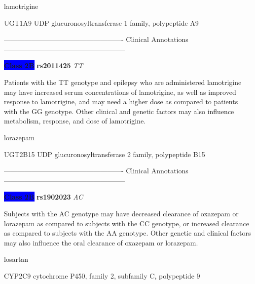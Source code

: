 \documentclass{resume} %
\begin{document}
\begin{rSection}{ lamotrigine }
\begin{rSubsection}{ UGT1A9 }{ UDP glucuronosyltransferase 1 family, polypeptide A9 }{}{}
\item[] ---------------------------------------------------- Clinical Annotations -----------------------------------------------------\newline
\item \textbf{\colorbox{blue} {Class 2B}} \textbf{ rs2011425 } \textit{ TT }
\item[] Patients with the TT genotype and epilepsy who are administered lamotrigine may have increased serum concentrations of lamotrigine, as well as improved response to lamotrigine, and may need a higher dose as compared to patients with the GG genotype. Other clinical and genetic factors may also influence metabolism, response, and dose of lamotrigine.  
\end{rSubsection}

\end{rSection}\begin{rSection}{ lorazepam }
\item[]

\begin{rSubsection}{ UGT2B15 }{ UDP glucuronosyltransferase 2 family, polypeptide B15 }{}{}
\item[]

\item[] ---------------------------------------------------- Clinical Annotations -----------------------------------------------------\newline
\item \textbf{\colorbox{blue} {Class 2B}} \textbf{ rs1902023 } \textit{ AC }
\item[] Subjects with the AC genotype may have decreased clearance of oxazepam or lorazepam as compared to subjects with the CC genotype, or increased clearance as compared to subjects with the AA genotype. Other genetic and clinical factors may also influence the oral clearance of oxazepam or lorazepam.
\end{rSubsection}

\end{rSection}\begin{rSection}{ losartan }
\item[]

\begin{rSubsection}{ CYP2C9 }{ cytochrome P450, family 2, subfamily C, polypeptide 9 }{}{}
\item[]


\end{rSubsection}
\end{rSection}
\end{document}
